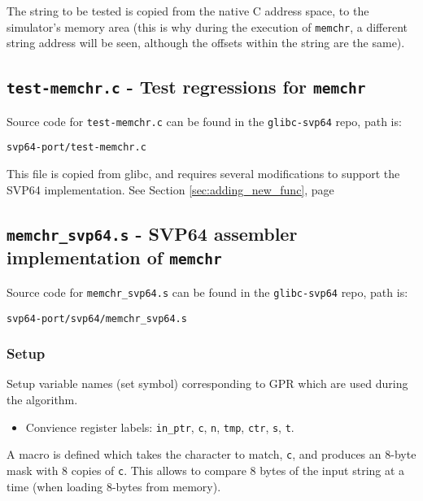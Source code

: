 The string to be tested is copied from the native C address space, to the
simulator's memory area (this is why during the execution of \texttt{memchr},
a different string address will be seen, although the offsets within the
string are the same).

\subsection{\texttt{test-memchr.c} - Test regressions for \texttt{memchr}}

Source code for \texttt{test-memchr.c} can be found in the
\texttt{glibc-svp64} repo, path is:
\begin{verbatim}
svp64-port/test-memchr.c
\end{verbatim}

This file is copied from glibc, and requires several modifications to support
the \acrshort{SVP64} implementation. See Section \ref{sec:adding_new_func},
page \pageref{sec:adding_new_func}

\subsection{\texttt{memchr\_svp64.s} - \acrshort{SVP64} assembler implementation of \texttt{memchr}}

Source code for \texttt{memchr\_svp64.s} can be found in the
\texttt{glibc-svp64} repo, path is:
\begin{verbatim}
svp64-port/svp64/memchr_svp64.s
\end{verbatim}

\subsubsection{Setup}

Setup variable names (set symbol) corresponding to \acrfull{GPR} which are used
during the algorithm.

\begin{itemize}
  \item Convience register labels: \texttt{in\_ptr}, \texttt{c}, \texttt{n},
  \texttt{tmp}, \texttt{ctr}, \texttt{s}, \texttt{t}.
\end{itemize}

A macro is defined which takes the character to match, \texttt{c},
and produces an 8-byte mask with 8 copies of \texttt{c}.
This allows to compare 8 bytes of the input string at a time
(when loading 8-bytes from memory).

